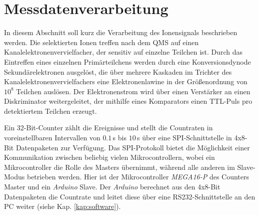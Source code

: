 \section{Messdatenverarbeitung}\label{sec:messdatenverarbeitung}
In diesem Abschnitt soll kurz die Verarbeitung des Ionensignals beschrieben
werden. Die selektierten Ionen treffen nach dem QMS auf einen
Kanalelektronenvervielfacher, der sensitiv auf einzelne Teilchen ist. Durch das
Eintreffen eines einzelnen Primärteilchens werden durch eine Konversionsdynode
Sekundärelektronen ausgelöst, die über mehrere Kaskaden im Trichter des
Kanalelektronenvervielfachers eine Elektronenlawine in der Größenordnung von
$10^8$ Teilchen auslösen. Der Elektronenstrom wird über einen Verstärker an
einen Diskriminator weitergeleitet, der mithilfe eines Komparators einen
TTL-Puls pro detektiertem Teilchen erzeugt.\par
Ein 32-Bit-Counter \cite{counterkarte_countraten} zählt die Ereignisse und
stellt die Countraten in voreinstellbaren Intervallen von $0.1\,$s bis $10\,$s
über eine SPI-Schnittstelle in 4x8-Bit Datenpaketen zur Verfügung. Das SPI-Protokoll bietet die Möglichkeit einer Kommunikation
zwischen beliebig vielen Mikrocontrollern, wobei ein Mikrocontroller die Rolle
des Masters übernimmt, während alle anderen im Slave-Modus betrieben werden.
Hier ist der Mikrocontroller \textit{MEGA16-P} des Counters Master und ein
\textit{Arduino} Slave. Der \textit{Arduino} berechnet aus den 4x8-Bit Datenpaketen die Countrate
und leitet diese über eine RS232-Schnittstelle an den PC weiter (siehe Kap.
\ref{kap:software}).

